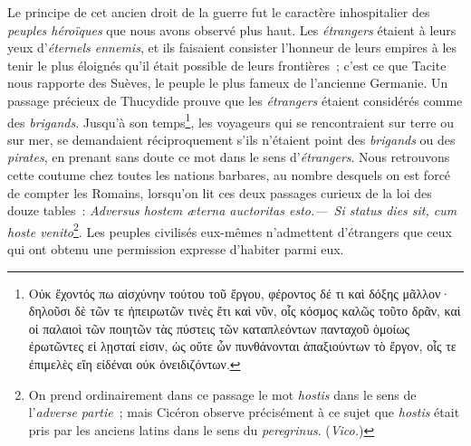 \documentclass[french,twoside]{book} %
\begin{document}
Le principe de cet ancien droit de la guerre fut le caractère inhospitalier des {\itshape peuples héroïques} que nous avons observé plus haut. Les {\itshape étrangers} étaient à leurs yeux d’{\itshape éternels ennemis}, et ils faisaient consister l’honneur de leurs empires à les tenir le plus éloignés qu’il était possible de leurs frontières ; c’est ce que Tacite nous rapporte des Suèves, le peuple le plus fameux de l’ancienne Germanie. Un passage précieux de Thucydide prouve que les {\itshape étrangers} étaient considérés comme des {\itshape brigands}. Jusqu’à son temps\footnote{Οὐκ ἔχοντός πω αἰσχύνην τούτου τοῦ ἔργου, φέροντος δέ τι καὶ δόξης μᾶλλον· δηλοῦσι δὲ τῶν τε ἠπειρωτῶν τινὲς ἔτι καὶ νῦν, οἷς κόσμος καλῶς τοῦτο δρᾶν, καὶ οἱ παλαιοὶ τῶν ποιητῶν τὰς πύστεις τῶν καταπλεόντων πανταχοῦ ὁμοίως ἐρωτῶντες εἰ λῃσταί εἰσιν, ὡς οὔτε ὧν πυνθάνονται ἀπαξιούντων τὸ ἔργον, οἷς τε ἐπιμελὲς εἴη εἰδέναι οὐκ ὀνειδιζόντων.}, les voyageurs qui se rencontraient sur terre ou sur mer, se demandaient réciproquement s’ils n’étaient point des {\itshape brigands} ou des {\itshape pirates}, en prenant  sans doute ce mot dans le sens d’{\itshape étrangers}. Nous retrouvons cette coutume chez toutes les nations barbares, au nombre desquels on est forcé de compter les Romains, lorsqu’on lit ces deux passages curieux de la loi des douze tables : \emph{{\itshape Adversus hostem æterna auctoritas esto.}}{\itshape  —} \emph{{\itshape Si status dies sit, cum hoste venito}}\footnote{On prend ordinairement dans ce passage le mot {\itshape hostis} dans le sens de l’{\itshape adverse partie} ; mais Cicéron observe précisément à ce sujet que {\itshape hostis} était pris par les anciens latins dans le sens du {\itshape peregrinus}. ({\itshape Vico.})}. Les peuples civilisés eux-mêmes n’admettent d’étrangers que ceux qui ont obtenu une permission expresse d’habiter parmi eux.\par
\end{document}
